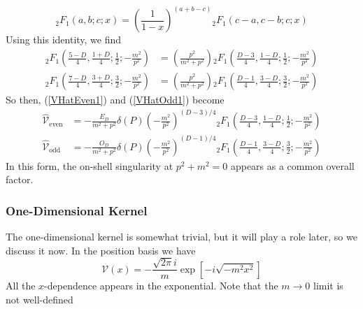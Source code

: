 \begin{equation}
	{}_{2} F_{1}(a, b; c; x) = \left( \frac{1}{1 - x} \right)^{(a + b - c)} {}_{2} F_{1} \left(c - a, c - b; c; x \right) \label{EulerId}
\end{equation}
Using this identity, we find
\begin{align}
	{}_{2} F_{1} \left( \frac{5 - D}{4}, \frac{1 + D}{4}; \frac{1}{2}; - \frac{m^{2}}{p^{2}}  \right) &= \left( \frac{p^{2}}{m^{2} + p^{2}} \right) {}_{2} F_{1} \left( \frac{D - 3}{4}, \frac{1 - D}{4}; \frac{1}{2}; - \frac{m^{2}}{p^{2}}  \right) \nonumber \\
	{}_{2} F_{1} \left( \frac{7 - D}{4}, \frac{3 + D}{4}; \frac{3}{2}; - \frac{m^{2}}{p^{2}}  \right) &= \left( \frac{p^{2}}{m^{2} + p^{2}} \right) {}_{2} F_{1} \left( \frac{D - 1}{4}, \frac{3 - D}{4}; \frac{3}{2}; - \frac{m^{2}}{p^{2}}  \right) \nonumber
\end{align}
So then, (\ref{VHatEven1}) and (\ref{VHatOdd1}) become
\begin{align}
	\widehat{\mathcal{V}}_{\text{even}} &= -\frac{E_{D}}{m^{2} + p^{2}} \delta(P) \left(- \frac{m^{2}}{p^{2}} \right)^{(D - 3)/4} {}_{2} F_{1} \left( \frac{D - 3}{4}, \frac{1 - D}{4}; \frac{1}{2}; - \frac{m^{2}}{p^{2}}  \right) \label{VHatEven2} \\
	\widehat{\mathcal{V}}_{\text{odd}} &=	 -\frac{O_{D}}{m^{2} + p^{2}} \delta(P) \left(- \frac{m^{2}}{p^{2}} \right)^{(D - 1)/4} {}_{2} F_{1} \left( \frac{D - 1}{4}, \frac{3 - D}{4}; \frac{3}{2}; - \frac{m^{2}}{p^{2}}  \right) \label{VHatOdd2}
\end{align}
In this form, the on-shell singularity at $p^{2} + m^{2} = 0$ appears as a common overall factor.
\subsubsection{One-Dimensional Kernel}
The one-dimensional kernel is somewhat trivial, but it will play a role later, so we discuss it now. In the position basis we have
\begin{equation}
	\mathcal{V}(x) = - \frac{\sqrt{2 \pi} i}{m} \exp{\left[ - i \sqrt{- m^{2} x^{2}} \right]} \label{VleckPropaX1}
\end{equation}
All the $x$-dependence appears in the exponential. Note that the $m \rightarrow 0$ limit is not well-defined

